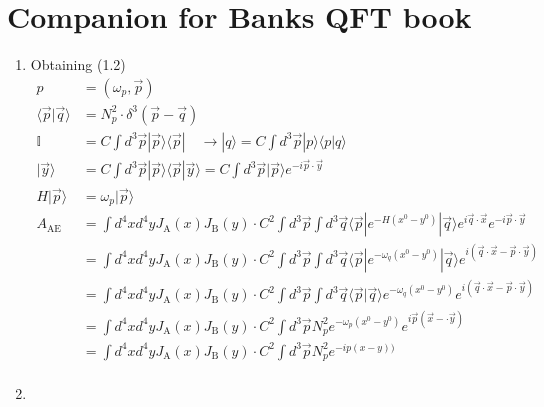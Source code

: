 \documentclass[10pt,a4paper]{article}
\theoremstyle{definition}
\begin{document}
\section{Companion for Banks QFT book}
\begin{enumerate}
\item Obtaining (1.2)
\begin{align*}
    p &= (\omega_p,\vec{p})\\
    \langle\vec{p}|\vec{q}\rangle&=N_p^2\cdot\delta^3(\vec{p}-\vec{q})\\
    \mathbb{I} &=C\int d^3\vec{p}|\vec{p}\rangle\langle\vec{p}|\quad\rightarrow |q\rangle=C\int d^3\vec{p}|p\rangle\langle p|q\rangle\\
    |\vec{y}\rangle &=C\int d^3\vec{p}|\vec{p}\rangle\langle\vec{p}|\vec{y}\rangle=C\int d^3\vec{p}|\vec{p}\rangle e^{-i\vec{p}\cdot\vec{y}}\\
    H|\vec{p}\rangle&=\omega_p|\vec{p}\rangle\\
    A_\text{AE}&=\int d^4xd^4y J_\text{A}(x)J_\text{B}(y)\cdot C^2\int d^3\vec{p}\int d^3\vec{q}\langle\vec{p}|e^{-H(x^0-y^0)}|\vec{q}\rangle e^{i\vec{q}\cdot\vec{x}} e^{-i\vec{p}\cdot\vec{y}}\\
    &=\int d^4xd^4y J_\text{A}(x)J_\text{B}(y)\cdot C^2\int d^3\vec{p}\int d^3\vec{q}\langle\vec{p}|e^{-\omega_q(x^0-y^0)}|\vec{q}\rangle e^{i(\vec{q}\cdot\vec{x}-\vec{p}\cdot\vec{y})}\\
    &=\int d^4xd^4y J_\text{A}(x)J_\text{B}(y)\cdot C^2\int d^3\vec{p}\int d^3\vec{q}\langle\vec{p}|\vec{q}\rangle e^{-\omega_q(x^0-y^0)} e^{i(\vec{q}\cdot\vec{x}-\vec{p}\cdot\vec{y})}\\
    &=\int d^4xd^4y J_\text{A}(x)J_\text{B}(y)\cdot C^2\int d^3\vec{p}N_p^2 e^{-\omega_p(x^0-y^0)} e^{i\vec{p}(\vec{x}-\cdot\vec{y})}\\
    &=\int d^4xd^4y J_\text{A}(x)J_\text{B}(y)\cdot C^2\int d^3\vec{p}N_p^2 e^{-ip(x-y))}\\
\end{align*}
\item

\end{enumerate}

\newpage 
\end{document}

